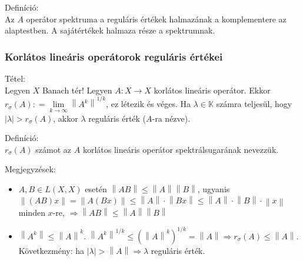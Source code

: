 \documentclass[12pt,a4paper]{scrartcl}
\providecommand{\tightlist}{%
  \setlength{\itemsep}{0pt}\setlength{\parskip}{0pt}}
\newenvironment{definicio}{}{}
\newenvironment{tetel}{}{}
\newenvironment{megjegyzes}{}{}
\begin{document}
\begin{definicio}

Definíció:\\
Az \(A\) operátor spektruma a reguláris értékek halmazának a
komplementere az alaptestben. A sajátértékek halmaza része a
spektrumnak.

\end{definicio}

\hypertarget{korlatos-linearis-operatorok-regularis-ertekei}{%
\subsubsection{Korlátos lineáris operátorok reguláris
értékei}\label{korlatos-linearis-operatorok-regularis-ertekei}}

\begin{tetel}

Tétel:\\
Legyen \(X\) Banach tér! Legyen \(\left. A:X\rightarrow X \right.\)
korlátos lineáris operátor. Ekkor
\(r_{\sigma}\left( A \right): = \lim\limits_{k\rightarrow\infty}\left\| A^{k} \right\|^{1/k}\),
ez létezik és véges. Ha \(\lambda \in {\mathbb{K}}\) számra teljesül,
hogy \(\left| \lambda \right| > r_{\sigma}\left( A \right)\), akkor
\(\lambda\) reguláris érték (\(A\)-ra nézve).

\end{tetel}

\begin{definicio}

Definíció:\\
\(r_{\sigma}\left( A \right)\) számot az \(A\) korlátos lineáris
operátor spektrálsugarának nevezzük.

\end{definicio}

\begin{megjegyzes}

Megjegyzések:

\begin{itemize}
\tightlist
\item
  \(A,B \in L\left( {X,X} \right)\) esetén
  \(\left\| {AB} \right\| \leq \left\| A \right\|\left\| B \right\|\),
  ugyanis
  \(\left\| {\left( {AB} \right)x} \right\| = \left\| {A\left( {Bx} \right)} \right\| \leq \left\| A \right\| \cdot \left\| {Bx} \right\| \leq \left\| A \right\| \cdot \left\| B \right\| \cdot \left\| x \right\|\)
  minden \(x\)-re,
  \(\left. \Rightarrow\left\| {AB} \right\| \leq \left\| A \right\|\left\| B \right\| \right.\)
\item
  \(\left\| A^{k} \right\| \leq \left\| A \right\|^{k}\).
  \(\left. \left\| A^{k} \right\|^{1/k} \leq \left( \left\| A \right\|^{k} \right)^{1/k} = \left\| A \right\|\Rightarrow r_{\sigma}\left( A \right) \leq \left\| A \right\| \right.\).
  Következmény: ha
  \(\left. \left| \lambda \right| > \left\| A \right\|\Rightarrow\lambda \right.\)
  reguláris érték.
\end{itemize}

\end{megjegyzes}
\end{document}
